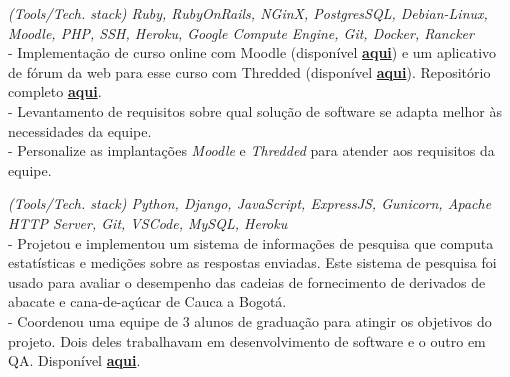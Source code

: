 \documentclass[]{CV-JuanCamiloFlorez}
\begin{document}
\begin{minipage}[t]{0.66\textwidth}
    \noindent
    \focusareas{}
    \textit{(Tools/Tech. stack) Ruby, RubyOnRails, NGinX, PostgresSQL, Debian-Linux, Moodle, PHP, SSH, Heroku, Google Compute Engine, Git, Docker, Rancker} \\
        - Implementação de curso online com Moodle (disponível \textbf{\href{https://gitlab.com/VanJFlorez/animal-modeling-ethics/tree/master/docs/4 LMS build}{aqui}}) e um aplicativo de fórum da web para esse curso com Thredded (disponível \textbf{\href{https://gitlab.com/VanJFlorez/animal-modeling-ethics/blob/master/docs/3\%20Social\%20WebApp/CP\%20etica\%20animal\%20webApp.pdf}{aqui}}). Repositório completo \textbf{\href{https://gitlab.com/VanJFlorez/animal-modeling-ethics/}{aqui}}. \\
        - Levantamento de requisitos sobre qual solução de software se adapta melhor às necessidades da equipe. \\
        - Personalize as implantações \textit{Moodle} e \textit{Thredded} para atender aos requisitos da equipe. \\
        \sectionsep

    \noindent
    \focusareas{}
    \textit{(Tools/Tech. stack) Python, Django, JavaScript, ExpressJS, Gunicorn, Apache HTTP Server, Git, VSCode, MySQL, Heroku} \\
        - Projetou e implementou um sistema de informações de pesquisa que computa estatísticas e medições sobre as respostas enviadas. Este sistema de pesquisa foi usado para avaliar o desempenho das cadeias de fornecimento de derivados de abacate e cana-de-açúcar de Cauca a Bogotá. \\
        - Coordenou uma equipe de 3 alunos de graduação para atingir os objetivos do projeto. Dois deles trabalhavam em desenvolvimento de software e o outro em QA. Disponível \textbf{\href{https://gitlab.com/VanJFlorez/sepro-webapp}{aqui}}. \\
        \sectionsep

 
\vspace{\topsep} %



\end{minipage}
\end{document}
